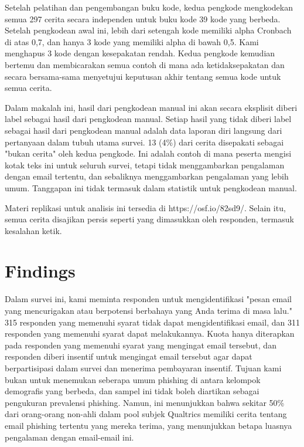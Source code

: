 \documentclass[lettersize,journal]{IEEEtran}
\begin{document}
Setelah pelatihan dan pengembangan buku kode, kedua pengkode mengkodekan semua
297 cerita secara independen untuk buku kode 39 kode yang berbeda. Setelah
pengkodean awal ini, lebih dari setengah kode memiliki alpha Cronbach di atas
0,7, dan hanya 3 kode yang memiliki alpha di bawah 0,5. Kami menghapus 3 kode
dengan kesepakatan rendah. Kedua pengkode kemudian bertemu dan membicarakan
semua contoh di mana ada ketidaksepakatan dan secara bersama-sama menyetujui
keputusan akhir tentang semua kode untuk semua cerita.

Dalam makalah ini, hasil dari pengkodean manual ini akan secara eksplisit
diberi label sebagai hasil dari pengkodean manual. Setiap hasil yang tidak
diberi label sebagai hasil dari pengkodean manual adalah data laporan diri
langsung dari pertanyaan dalam tubuh utama survei. 13 (4\%) dari cerita
disepakati sebagai "bukan cerita" oleh kedua pengkode. Ini adalah contoh di
mana peserta mengisi kotak teks ini untuk seluruh survei, tetapi tidak
menggambarkan pengalaman dengan email tertentu, dan sebaliknya menggambarkan
pengalaman yang lebih umum. Tanggapan ini tidak termasuk dalam statistik untuk
pengkodean manual.

Materi replikasi untuk analisis ini tersedia di https://osf.io/82sd9/. Selain
itu, semua cerita disajikan persis seperti yang dimasukkan oleh responden,
termasuk kesalahan ketik.

\section{Findings}

Dalam survei ini, kami meminta responden untuk mengidentifikasi "pesan email
yang mencurigakan atau berpotensi berbahaya yang Anda terima di masa lalu." 315
responden yang memenuhi syarat tidak dapat mengidentifikasi email, dan 311
responden yang memenuhi syarat dapat melakukannya. Kuota hanya diterapkan pada
responden yang memenuhi syarat yang mengingat email tersebut, dan responden
diberi insentif untuk mengingat email tersebut agar dapat berpartisipasi dalam
survei dan menerima pembayaran insentif. Tujuan kami bukan untuk menemukan
seberapa umum phishing di antara kelompok demografis yang berbeda, dan sampel
ini tidak boleh diartikan sebagai pengukuran prevalensi phishing. Namun, ini
menunjukkan bahwa sekitar 50\% dari orang-orang non-ahli dalam pool subjek
Qualtrics memiliki cerita tentang email phishing tertentu yang mereka terima,
yang menunjukkan betapa luasnya pengalaman dengan email-email ini.
\end{document}
